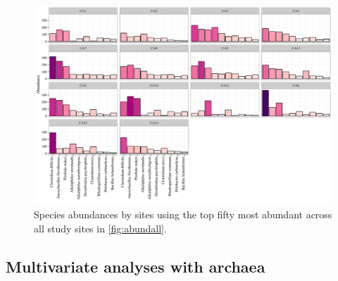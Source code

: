 \documentclass[letterpaper,12pt]{article}\usepackage[]{graphicx}\usepackage[]{color}
\newenvironment{knitrout}{}{} %
\begin{document}
\begin{landscape}
\centering\vspace*{\fill}
\begin{knitrout}
\color{fgcolor}\begin{figure}[!ht]

{\centering \includegraphics[width=1.1\textwidth]{figs/abundsite-1} 

}

\caption{Species abundances by sites using the top fifty most abundant across all study sites in \cref{fig:abundall}.}\label{fig:abundsite}
\end{figure}


\end{knitrout}
\end{landscape}
\clearpage

\subsection{Multivariate analyses with archaea}
\end{document}

